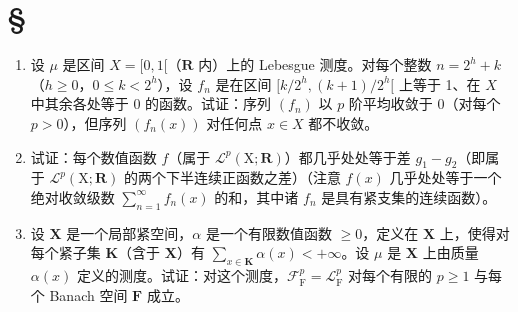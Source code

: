 \section*{\texorpdfstring{\S\CurrentExerciseGroup}{第{\CurrentExerciseGroup}节}}
{}

\begin{enumerate}
\def\labelenumi{\arabic{enumi})}
\item
  设 \(\mu\) 是区间 \(X = [0,1[\)（\(\mathbf{R}\) 内）上的 Lebesgue 测度。对每个整数 \(n = 2^h + k\)（\(h \geqslant 0\)，\(0 \leqslant k < 2^h\)），设 \(f_n\) 是在区间 \([k/2^h, (k+1)/2^h[\) 上等于 1、在 \(X\) 中其余各处等于 0 的函数。试证：序列 \((f_n)\) 以 \(p\) 阶平均收敛于 0（对每个 \(p > 0\)），但序列 \((f_n(x))\) 对任何点 \(x \in X\) 都不收敛。
\item
  试证：每个数值函数 \(f\)（属于 \(\mathcal{L}^p(\mathrm{X};\mathbf{R})\)）都几乎处处等于差 \(g_1 - g_2\)（即属于 \(\mathcal{L}^p(\mathrm{X};\mathbf{R})\) 的两个下半连续正函数之差）（注意 \(f(x)\) 几乎处处等于一个绝对收敛级数 \(\sum_{n=1}^{\infty} f_n(x)\) 的和，其中诸 \(f_n\) 是具有紧支集的连续函数）。
\item
  设 \(\mathbf{X}\) 是一个局部紧空间，\(\alpha\) 是一个有限数值函数 \(\geqslant 0\)，定义在 \(\mathbf{X}\) 上，使得对每个紧子集 \(\mathbf{K}\)（含于 \(\mathbf{X}\)）有 \(\sum_{x\in \mathbf{K}}\alpha (x) < +\infty\)。设 \(\mu\) 是 \(\mathbf{X}\) 上由质量 \(\alpha (x)\) 定义的测度。试证：对这个测度，\(\mathcal{F}_{\mathrm{F}}^{p} = \mathcal{L}_{\mathrm{F}}^{p}\) 对每个有限的 \(p\geqslant 1\) 与每个 Banach 空间 \(\mathbf{F}\) 成立。
\end{enumerate}

\setcounter{exercisegroup}{4}
\edef\CurrentExerciseGroup{\arabic{exercisegroup}}
